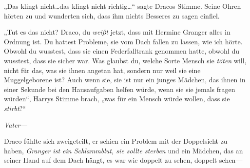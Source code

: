 „Das klingt nicht…das klingt nicht richtig…“ sagte Dracos Stimme. Seine Ohren hörten zu und wunderten sich, dass ihm nichts Besseres zu sagen einfiel.

„Tut es das nicht? Draco, du \emph{weißt} jetzt, dass mit Hermine Granger alles in Ordnung ist. Du hattest Probleme, sie vom Dach fallen zu lassen, wie ich hörte. Obwohl du wusstest, dass sie einen Federfalltrank genommen hatte, obwohl du wusstest, dass sie sicher war. Was glaubst du, welche Sorte Mensch sie \emph{töten} will, nicht für das, was sie ihnen angetan hat, sondern nur weil sie eine Muggelgeborene ist? Auch wenn sie, sie ist nur ein junges Mädchen, das ihnen in einer Sekunde bei den Hausaufgaben helfen würde, wenn sie sie jemals fragen würden“, Harrys Stimme brach, „was für ein Mensch würde wollen, dass sie \emph{stirbt}?“

\emph{Vater—}

Draco fühlte sich zweigeteilt, er schien ein Problem mit der Doppelsicht zu haben, \emph{Granger ist ein Schlammblut, sie sollte sterben} und ein Mädchen, das an seiner Hand auf dem Dach hängt, es war wie doppelt zu sehen, doppelt sehen—

